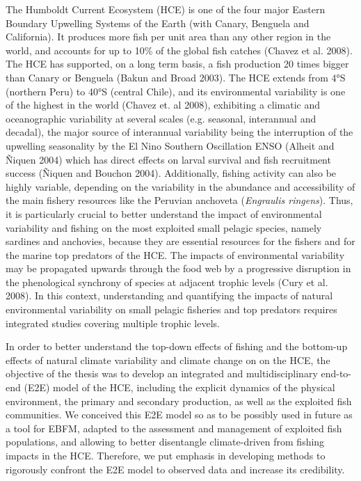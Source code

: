 The Humboldt Current Ecosystem (HCE) is one of the four major Eastern Boundary Upwelling Systems of the Earth (with Canary, Benguela and California). It produces more fish per unit area than any other region in the world, and accounts for up to 10\% of the global fish catches (Chavez et al. 2008). The HCE has supported, on a long term basis, a fish production 20 times bigger than Canary or Benguela (Bakun and Broad 2003). The HCE extends from 4°S (northern Peru) to 40°S (central Chile), and its environmental variability is one of the highest in the world (Chavez et. al 2008), exhibiting a climatic and oceanographic variability at several scales (e.g. seasonal, interannual and decadal), the major source of interannual variability being the interruption of the upwelling seasonality by the El Nino Southern Oscillation ENSO (Alheit and Ñiquen 2004) which has direct effects on larval survival and fish recruitment success (Ñiquen and Bouchon 2004). Additionally, fishing activity can also be highly variable, depending on the variability in the abundance and accessibility of the main fishery resources like the Peruvian anchoveta (\emph{Engraulis ringens}). Thus, it is particularly crucial to better understand the impact of environmental variability and fishing on the most exploited small pelagic species, namely sardines and anchovies, because they are essential resources for the fishers and for the marine top predators of the HCE. The impacts of environmental variability may be propagated upwards through the food web by a progressive disruption in the phenological synchrony of species at adjacent trophic levels (Cury et al. 2008). In this context, understanding and quantifying the impacts of natural environmental variability on small pelagic fisheries and top predators requires integrated studies covering multiple trophic levels. 

In order to better understand the top-down effects of fishing and the bottom-up effects of natural climate variability and climate change on on the HCE, the objective of the thesis was to develop an integrated and multidisciplinary end-to-end (E2E) model of the HCE, including the explicit dynamics of the physical environment, the primary and secondary production, as well as the exploited fish communities. We conceived this E2E model so as to be possibly used in future as a tool for EBFM, adapted to the assessment and management of exploited fish populations, and allowing to better disentangle climate-driven from fishing impacts in the HCE. Therefore, we put emphasis in developing methods to rigorously confront the E2E model to observed data and increase its credibility.

